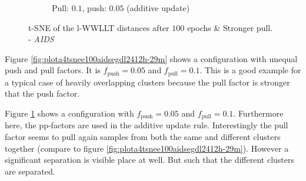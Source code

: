 \begin{figure}[H]
\begin{subfigure}{0.49\textwidth}
				\caption{Pull: $0.1$, push: $0.05$ (additive update)}
				\label{fig:plota4tsnee100aidsegdl2413h-38m}
			\end{subfigure}
			\caption{t-SNE of the l-WWLLT distances after $100$ epochs \& Stronger pull. - \textit{AIDS}}
			\label{fig:tSNE_100_B}
		\end{figure}	
		
		Figure \ref{fig:plota4tsnee100aidsegdl2412h-29m} shows a configuration with unequal push and pull factors. 
		It is $f_{\text{push}}=0.05$ and $f_{\text{pull}}=0.1$.
		This is a good example for a typical case of heavily overlapping clusters because the pull factor is stronger that the push factor.
		
		Figure \ref{fig:plota4tsnee100aidsegdl2413h-38m} shows a configuration with $f_{\text{push}}=0.05$ and $f_{\text{pull}}=0.1$.
		Furthermore here, the pp-factors are used in the additive update rule.
		Interestingly the pull factor seems to pull again samples from both the same and different clusters together (compare to figure \ref{fig:plota4tsnee100aidsegdl2412h-29m}).
		However a significant separation is visible place at well.
		But such that the different clusters are separated.
		
